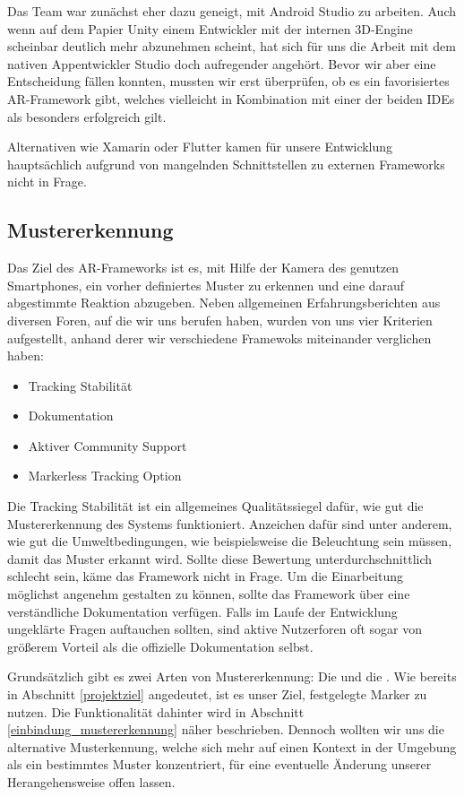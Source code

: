 Das Team war zunächst eher dazu geneigt, mit Android Studio zu arbeiten. Auch wenn auf dem Papier Unity einem Entwickler mit der internen 3D-Engine scheinbar deutlich mehr abzunehmen scheint, hat sich für uns die Arbeit mit dem nativen Appentwickler Studio doch aufregender angehört. Bevor wir aber eine Entscheidung fällen konnten, mussten wir erst überprüfen, ob es ein favorisiertes AR-Framework gibt, welches vielleicht in Kombination mit einer der beiden IDEs als besonders erfolgreich gilt.

Alternativen wie Xamarin oder Flutter kamen für unsere Entwicklung hauptsächlich aufgrund von mangelnden Schnittstellen zu externen Frameworks nicht in Frage.
\subsection{Mustererkennung}
Das Ziel des AR-Frameworks ist es, mit Hilfe der Kamera des genutzen Smartphones, ein vorher definiertes Muster zu erkennen und eine darauf abgestimmte Reaktion abzugeben. Neben allgemeinen Erfahrungsberichten aus diversen Foren, auf die wir uns berufen haben, wurden von uns vier Kriterien aufgestellt, anhand derer wir verschiedene Framewoks miteinander verglichen haben:
\begin{itemize}
\item Tracking Stabilität
\item Dokumentation
\item Aktiver Community Support
\item Markerless Tracking Option
\end{itemize}
Die Tracking Stabilität ist ein allgemeines Qualitätssiegel dafür, wie gut die Mustererkennung des Systems funktioniert. Anzeichen dafür sind unter anderem, wie gut die Umweltbedingungen, wie beispielsweise die Beleuchtung sein müssen, damit das Muster erkannt wird. Sollte diese Bewertung unterdurchschnittlich schlecht sein, käme das Framework nicht in Frage.
Um die Einarbeitung möglichst angenehm gestalten zu können, sollte das Framework über eine verständliche Dokumentation verfügen.
Falls im Laufe der Entwicklung ungeklärte Fragen auftauchen sollten, sind aktive Nutzerforen oft sogar von größerem Vorteil als die offizielle Dokumentation selbst. 

Grundsätzlich gibt es zwei Arten von Mustererkennung: Die  und die . Wie bereits in Abschnitt \ref{projektziel} angedeutet, ist es unser Ziel, festgelegte Marker zu nutzen. Die Funktionalität dahinter wird in Abschnitt \ref{einbindung_mustererkennung} näher beschrieben. Dennoch wollten wir uns die alternative  Musterkennung, welche sich mehr auf einen Kontext in der Umgebung als ein bestimmtes Muster konzentriert, für eine eventuelle Änderung unserer Herangehensweise offen lassen.

